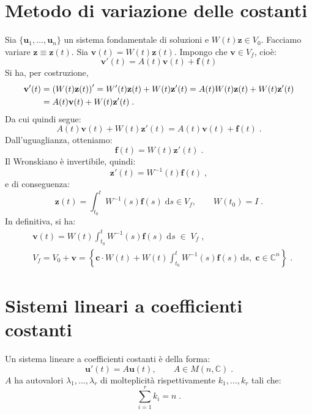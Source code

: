 \documentclass[a4paper,12pt]{report}
\theoremstyle{plain}
\theoremstyle{definition}
\theoremstyle{remark}
\newcommand{\diff}[1]{\mathrm{d}#1}
\numberwithin{equation}{section}
\begin{document}
\section{Metodo di variazione delle costanti}
Sia $\{\mathbf{u}_1,\ldots,\mathbf{u}_n\}$ un sistema fondamentale di soluzioni e $W(t)\mathbf{z} \in V_0$. Facciamo variare $\mathbf{z} 
\equiv \mathbf{z}(t)$. Sia $\mathbf{v}(t)=W(t)\mathbf{z}(t)$. Impongo che $\mathbf{v} \in V_f$, cioè:
$$
\mathbf{v}'(t)=A(t)\mathbf{v}(t)+\mathbf{f}(t)
$$
Si ha, per costruzione,
\begin{align}
\mathbf{v}'(t) &=\left(W(t)\mathbf{z}(t)\right)'=W'(t)\mathbf{z}(t)+W(t)\mathbf{z}'(t)=A(t)W(t)\mathbf{z}(t)+W(t)\mathbf{z}'(t) \notag \\
&=A(t)\mathbf{v}(t)+W(t)\mathbf{z}'(t)\;.
\end{align}
Da cui quindi segue:
\begin{equation}
A(t)\mathbf{v}(t)+W(t)\mathbf{z}'(t)=A(t)\mathbf{v}(t)+\mathbf{f}(t)\;.
\end{equation}
Dall'uguaglianza, otteniamo:
\begin{equation}
\mathbf{f}(t)=W(t)\mathbf{z}'(t)\;.
\end{equation}
Il Wronskiano è invertibile, quindi:
\begin{equation}
\mathbf{z}'(t)=W^{-1}(t)\mathbf{f}(t)\;,
\end{equation}
e di conseguenza:
\begin{equation}
\mathbf{z}(t)=\int_{t_0}^t W^{-1}(s)\mathbf{f}(s)\;\diff{s} \in V_f, \qquad W(t_0)=I\;.
\end{equation}
In definitiva, si ha:
\begin{align}
&\mathbf{v}(t)=W(t)\int_{t_0}^t W^{-1}(s)\mathbf{f}(s)\;\diff{s}\; \in\; V_f\;, \\
&V_f=V_0+\mathbf{v}=\left\{\mathbf{c}\cdot W(t)+W(t)\int_{t_0}^t W^{-1}(s)\mathbf{f}(s)\,\diff{s},\; \mathbf{c}\in\mathbb{C}^n\right\}\;.
\end{align}
\section{Sistemi lineari a coefficienti costanti}
Un sistema lineare a coefficienti costanti è della forma:
\begin{equation}
\mathbf{u}'(t)=A \mathbf{u}(t), \qquad A \in M(n,\mathbb{C})\;.
\end{equation}
$A$ ha autovalori $\lambda_1,\ldots,\lambda_r$ di molteplicità rispettivamente $k_1,\ldots,k_r$ tali che:
\begin{equation}
\sum_{i=1}^r k_i = n\;.
\end{equation}
\end{document}
